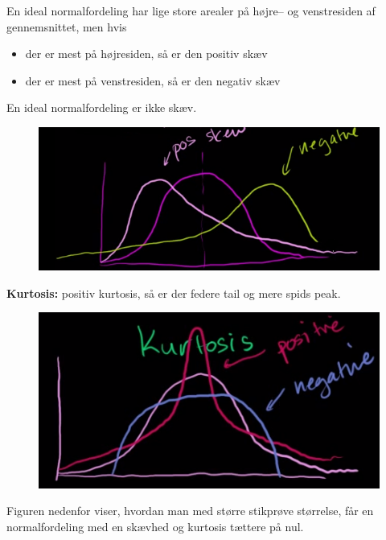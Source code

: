\documentclass[11pt]{article}
\begin{document}
En ideal normalfordeling har lige store arealer på højre-- og venstresiden af gennemsnittet, men hvis
\begin{itemize}\itemsep-2pt
\item der er mest på højresiden, så er den positiv skæv
\item der er mest på venstresiden, så er den negativ skæv
\end{itemize}
En ideal normalfordeling er ikke skæv.
\begin{figure}[H]
\centering
\includegraphics[scale=0.5]{img/Selection_007}
\end{figure}
\textbf{Kurtosis:} positiv kurtosis, så er der federe tail og mere spids peak. 
\begin{figure}[H]
\centering
\includegraphics[scale=0.5]{img/Selection_008}
\end{figure}
Figuren nedenfor viser, hvordan man med større stikprøve størrelse, får en normalfordeling med en skævhed og kurtosis tættere på nul. 
\end{document}
